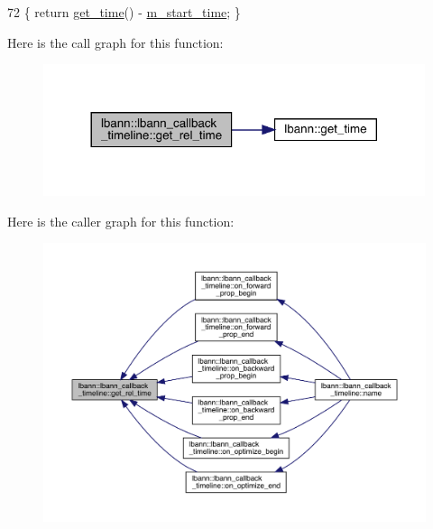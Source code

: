 \begin{DoxyCode}
72 \{ \textcolor{keywordflow}{return} \hyperlink{namespacelbann_a478d36031ff0659893c4322cd856157f}{get\_time}() - \hyperlink{classlbann_1_1lbann__callback__timeline_a624a9b00735fb7644d544ec6ed83dd27}{m\_start\_time}; \}
\end{DoxyCode}
Here is the call graph for this function\+:\nopagebreak
\begin{figure}[H]
\begin{center}
\leavevmode
\includegraphics[width=317pt]{classlbann_1_1lbann__callback__timeline_a67da1376356bf2153ab67489014e0ad4_cgraph}
\end{center}
\end{figure}
Here is the caller graph for this function\+:\nopagebreak
\begin{figure}[H]
\begin{center}
\leavevmode
\includegraphics[width=350pt]{classlbann_1_1lbann__callback__timeline_a67da1376356bf2153ab67489014e0ad4_icgraph}
\end{center}
\end{figure}
\mbox{\label{classlbann_1_1lbann__callback__timeline_aaede0408ae30a3c82f567981e374a224}} 
